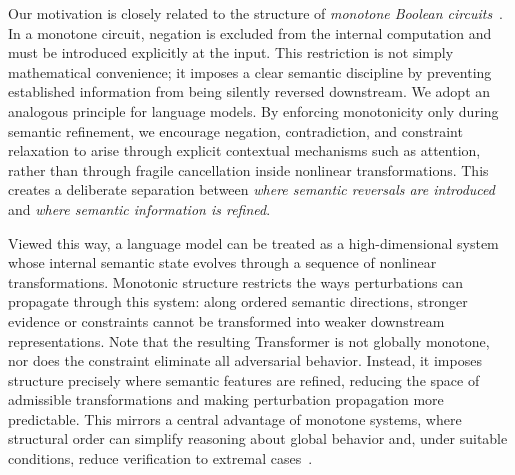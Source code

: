 \documentclass{article}
\theoremstyle{plain}
\theoremstyle{definition}
\theoremstyle{remark}
\begin{document}
Our motivation is closely related to the structure of \emph{monotone Boolean circuits}~\citep{jukna2012boolean}. In a monotone circuit, negation is excluded from the internal computation and must be introduced explicitly at the input. This restriction is not simply mathematical convenience; it imposes a clear semantic discipline by preventing established information from being silently reversed downstream. We adopt an analogous principle for language models. By enforcing monotonicity only during semantic refinement, we encourage negation, contradiction, and constraint relaxation to arise through explicit contextual mechanisms such as attention, rather than through fragile cancellation inside nonlinear transformations. This creates a deliberate separation between \emph{where semantic reversals are introduced} and \emph{where semantic information is refined}.

Viewed this way, a language model can be treated as a high-dimensional system whose internal semantic state evolves through a sequence of nonlinear transformations. Monotonic structure restricts the ways perturbations can propagate through this system: along ordered semantic directions, stronger evidence or constraints cannot be transformed into weaker downstream representations. Note that the resulting Transformer is not globally monotone, nor does the constraint eliminate all adversarial behavior. %
Instead, it imposes structure precisely where semantic features are refined, reducing the space of admissible transformations and making perturbation propagation more predictable. This mirrors a central advantage of monotone systems, where structural order can simplify reasoning about global behavior and, under suitable conditions, reduce verification to extremal cases~\citep{feyzmahdavian2017stability}.


\end{document}
